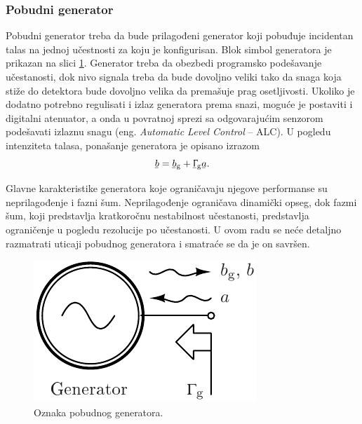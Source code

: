 \documentclass[a4paper, 12pt, diplomski]{etf}
\newcommand{\faz}[1]{\underaccent{\bar}{#1}}
\begin{document}
\subsubsection{Pobudni generator}
Pobudni generator treba da bude prilagođeni generator koji pobuđuje
incidentan talas na jednoj učestnosti za koju je konfigurisan.
Blok simbol generatora je prikazan
na slici \ref{fig:vsymb}. Generator treba 
da obezbedi programsko podešavanje učestanosti, dok nivo signala treba 
da bude dovoljno veliki tako da snaga koja stiže do detektora bude 
dovoljno velika da premašuje prag osetljivosti. Ukoliko je dodatno potrebno regulisati i izlaz generatora prema snazi,
moguće je postaviti i digitalni atenuator, a onda u povratnoj sprezi sa odgovarajućim senzorom 
podešavati izlaznu snagu
(eng. \textit{Automatic Level Control} -- ALC). 
U pogledu intenziteta talasa, ponašanje generatora je opisano 
izrazom
\begin{equation}
    \faz b = \faz b_{\rm g} + 
    \faz \Upgamma_{\rm g} \faz a.
\end{equation}

Glavne karakteristike
generatora koje ograničavaju njegove
performanse su neprilagođenje i
fazni šum.
Neprilagođenje ograničava dinamički opseg, dok fazmi šum, 
koji predstavlja kratkoročnu nestabilnost učestanosti, predstavlja 
ograničenje u pogledu rezolucije po učestanosti. 
U ovom radu se neće detaljno
razmatrati uticaji pobudnog generatora i smatraće 
se da je on savršen.
%
\begin{figure}[ht!]
        \centering
        \includegraphics[scale = 1]
        {fig/vgen_symbol.pdf}
        \caption{Oznaka pobudnog generatora.}
        \label{fig:vsymb}
\end{figure}
\end{document}
